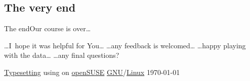 \documentclass[compress, ucs, xelatex, 11pt, xcolor=x11names, aspectratio=1609,
	hyperref={
		bookmarks=true,
		unicode=true,
		colorlinks=true,
		pdftitle={HybSeq course},
		plainpages=false,
		pdfauthor={Vojtech Zeisek},
		pdfsubject={Practical processing of HybSeq target enrichment sequencing data on computing grids like MetaCentrum},
		pdfcreator={XeLaTeX},
		pdfkeywords={BASH, command line, GNU, HybSeq, Linux, MetaCentrum, sequencing shell, target enrichment},
		linkcolor=Cyan2, %
		anchorcolor=Firebrick2, %
		citecolor=Firebrick2, %
		filecolor=Firebrick2, %
		menucolor=Firebrick2, %
		urlcolor=Chartreuse2, %
		pdftex},
	url={hyphens, lowtilde} %
	]{beamer}
\begin{document}
\subsection{The very end}

\begin{frame}{The end}{Our course is over\ldots}
	\begin{center}
		\ldots I~hope it was helpful for You\ldots
		\vfill
		\ldots any feedback is welcomed\ldots
		\vfill
		\ldots happy playing with the data\ldots
		\vfill
		\ldots any final questions?
		\vfill
	\end{center}
	\vfill
	\begin{flushright}
		\begin{tiny}
		\href{https://en.wikipedia.org/wiki/XeTeX}{Typesetting} using \XeLaTeX{ }on \href{https://www.opensuse.org/}{openSUSE} \href{https://en.wikipedia.org/wiki/GNU}{GNU}/\href{https://en.wikipedia.org/wiki/Linux}{Linux} \today
		\end{tiny}
	\end{flushright}
\end{frame}
\end{document}
